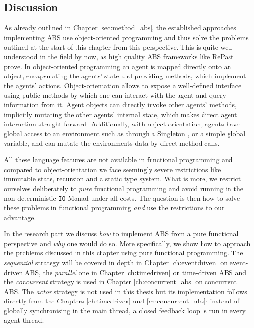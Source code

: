 \subsection{Discussion}
As already outlined in Chapter \ref{sec:method_abs}, the established approaches implementing ABS use object-oriented programming and thus solve the problems outlined at the start of this chapter from this perspective. This is quite well understood  in the field by now, as high quality ABS frameworks like RePast \cite{north_complex_2013} prove. In object-oriented programming an agent is mapped directly onto an object, encapsulating the agents' state and providing methods, which implement the agents' actions. Object-orientation allows to expose a well-defined interface using public methods by which one can interact with the agent and query information from it. Agent objects can directly invoke other agents' methods, implicitly mutating the other agents' internal state, which makes direct agent interaction straight forward. Additionally, with object-orientation, agents have global access to an environment such as through a Singleton \cite{gamma_design_1994}, or a simple global variable, and can mutate the environments data by direct method calls.

All these language features are not available in functional programming and compared to object-orientation we face seemingly severe restrictions like immutable state, recursion and a static type system. What is more, we restrict ourselves deliberately to \textit{pure} functional programming and avoid running in the non-deterministic \texttt{IO} Monad under all costs. The question is then how to solve these problems in functional programming \textit{and} use the restrictions to our advantage.

In the research part we discuss \textit{how} to implement ABS from a pure functional perspective and \textit{why} one would do so. More specifically, we show how to approach the problems discussed in this chapter using pure functional programming. The \textit{sequential} strategy will be covered in depth in Chapter \ref{ch:eventdriven} on event-driven ABS, the \textit{parallel} one in Chapter \ref{ch:timedriven} on time-driven ABS and the \textit{concurrent} strategy is used in Chapter \ref{ch:concurrent_abs} on concurrent ABS. The \textit{actor} strategy is not used in this thesis but its implementation follows directly from the Chapters \ref{ch:timedriven} and \ref{ch:concurrent_abs}: instead of globally synchronising in the main thread, a closed feedback loop is run in every agent thread.